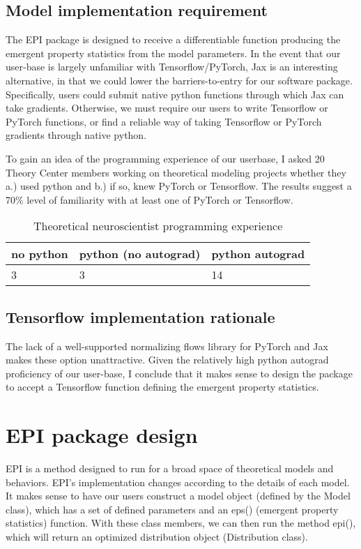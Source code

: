 \documentclass[11pt]{article}
\begin{document}
\subsection{Model implementation requirement}
The EPI package is designed to receive a differentiable function producing the emergent property statistics from the model parameters.  
In the event that our user-base is largely unfamiliar with Tensorflow/PyTorch, Jax is an interesting alternative, in that we could lower the barriers-to-entry for our software package.
Specifically, users could submit native python functions through which Jax can take gradients.
Otherwise, we must require our users to write Tensorflow or PyTorch functions, or find a reliable way of taking Tensorflow or PyTorch gradients through native python.

To gain an idea of the programming experience of our userbase, I asked 20 Theory Center members working on theoretical modeling projects whether they a.) used python and b.) if so, knew PyTorch or Tensorflow.  The results suggest a 70\% level of familiarity with at least one of PyTorch or Tensorflow.

\begin{table}[h]
\caption{Theoretical neuroscientist programming experience}
\begin{center}
\begin{tabular}{|l|l|l|}
\hline
no python & python (no autograd) & python autograd\\ \hline
3 & 3 & 14 \\ \hline
\end{tabular}
\end{center}
\end{table}
\subsection{Tensorflow implementation rationale}
The lack of a well-supported normalizing flows library for PyTorch and Jax makes these option unattractive.  Given the relatively high python autograd proficiency of our user-base, I conclude that it makes sense to design the package to accept a Tensorflow function defining the emergent property statistics.

\clearpage
\section{EPI package design}
EPI is a method designed to run for a broad space of theoretical models and behaviors.  EPI's implementation changes according to the details of each model.  It makes sense to have our users construct a model object (defined by the Model class), which has a set of defined parameters and an eps() (emergent property statistics) function.  With these class members, we can then run the method epi(), which will return an optimized distribution object (Distribution class).
\end{document}
